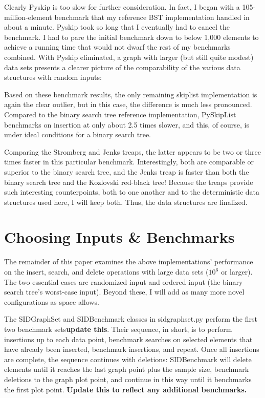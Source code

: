 \documentclass{article}
\newcommand {\todo}[1] {{\textbf{\color{red}#1}}}
\begin{document}


Clearly Pyskip is too slow for further consideration. In fact, I began with a 105-million-element benchmark that my reference BST implementation handled in about a minute. Pyskip took so long that I eventually had to cancel the benchmark. I had to pare the initial benchmark down to below 1,000 elements to achieve a running time that would not dwarf the rest of my benchmarks combined. With Pyskip eliminated, a graph with larger (but still quite modest) data sets presents a clearer picture of the comparability of the various data structures with random inputs:



Based on these benchmark results, the only remaining skiplist implementation is again the clear outlier, but in this case, the difference is much less pronounced. Compared to the binary search tree reference implementation, PySkipList benchmarks on insertion at only about 2.5 times slower, and this, of course, is under ideal conditions for a binary search tree.

Comparing the Stromberg and Jenks treaps, the latter appears to be two or three times faster in this particular benchmark. Interestingly, both are comparable or superior to the binary search tree, and the Jenks treap is faster than both the binary search tree and the Kozlovski red-black tree! Because the treaps provide such interesting counterpoints, both to one another and to the deterministic data structures used here, I will keep both. Thus, the data structures are finalized.

\section{Choosing Inputs \& Benchmarks}
The remainder of this paper examines the above implementations' performance on the insert, search, and delete operations with large data sets ($10^6$ or larger). The two essential cases are randomized input and ordered input (the binary search tree's worst-case input). Beyond these, I will add as many more novel configurations as space allows.

The SIDGraphSet and SIDBenchmark classes in sidgraphset.py perform the first two benchmark sets\todo{update this}. Their sequence, in short, is to perform insertions up to each data point, benchmark searches on selected elements that have already been inserted, benchmark insertions, and repeat. Once all insertions are complete, the sequence continues with deletions: SIDBenchmark will delete elements until it reaches the last graph point plus the sample size, benchmark deletions to the graph plot point, and continue in this way until it benchmarks the first plot point. \todo{Update this to reflect any additional benchmarks.}
\end{document}

